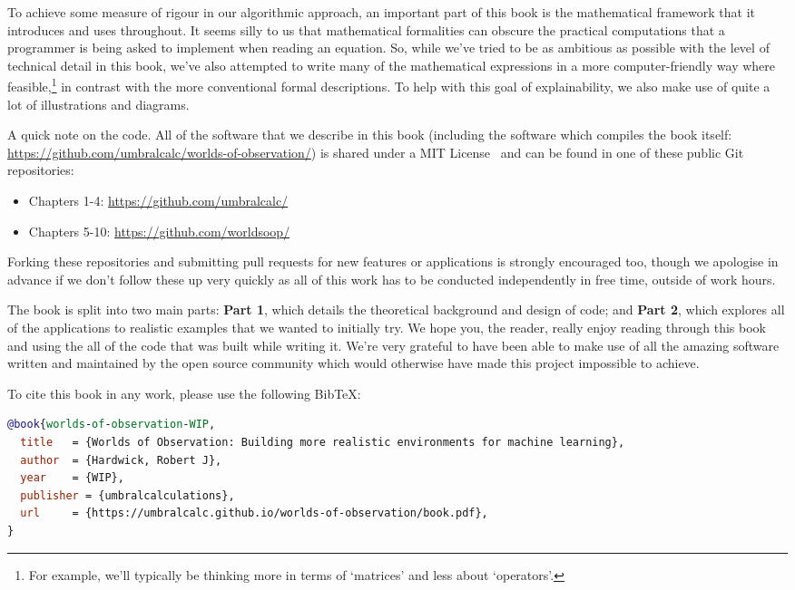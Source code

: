 \documentclass{book}
\begin{document}
To achieve some measure of rigour in our algorithmic approach, an important part of this book is the mathematical framework that it introduces and uses throughout. It seems silly to us that mathematical formalities can obscure the practical computations that a programmer is being asked to implement when reading an equation. So, while we've tried to be as ambitious as possible with the level of technical detail in this book, we've also attempted to write many of the mathematical expressions in a more computer-friendly way where feasible,\footnote{For example, we'll typically be thinking more in terms of `matrices' and less about `operators'.} in contrast with the more conventional formal descriptions. To help with this goal of explainability, we also make use of quite a lot of illustrations and diagrams.

A quick note on the code. All of the software that we describe in this book (including the software which compiles the book itself: \href{https://github.com/umbralcalc/worlds-of-observation/}{https://github.com/umbralcalc/worlds-of-observation/}) is shared under a MIT License~\cite{mitlicense} and can be found in one of these public Git repositories:
\begin{itemize}
\item{Chapters 1-4: \href{https://github.com/umbralcalc/}{https://github.com/umbralcalc/}}
\item{Chapters 5-10: \href{https://github.com/worldsoop/}{https://github.com/worldsoop/}} 
\end{itemize}
Forking these repositories and submitting pull requests for new features or applications is strongly encouraged too, though we apologise in advance if we don't follow these up very quickly as all of this work has to be conducted independently in free time, outside of work hours.

The book is split into two main parts: {\bfseries\sffamily Part 1}, which details the theoretical background and design of code; and {\bfseries\sffamily Part 2}, which explores all of the applications to realistic examples that we wanted to initially try. We hope you, the reader, really enjoy reading through this book and using the all of the code that was built while writing it. We're very grateful to have been able to make use of all the amazing software written and maintained by the open source community which would otherwise have made this project impossible to achieve.

To cite this book in any work, please use the following BibTeX:
\begin{adjustwidth}{2em}{2em}
\begin{lstlisting}[language=BibTeX,numbers=none]
@book{worlds-of-observation-WIP,
  title   = {Worlds of Observation: Building more realistic environments for machine learning},
  author  = {Hardwick, Robert J},
  year    = {WIP},
  publisher = {umbralcalculations},
  url     = {https://umbralcalc.github.io/worlds-of-observation/book.pdf},
}
\end{lstlisting}
\end{adjustwidth}
\end{document}
